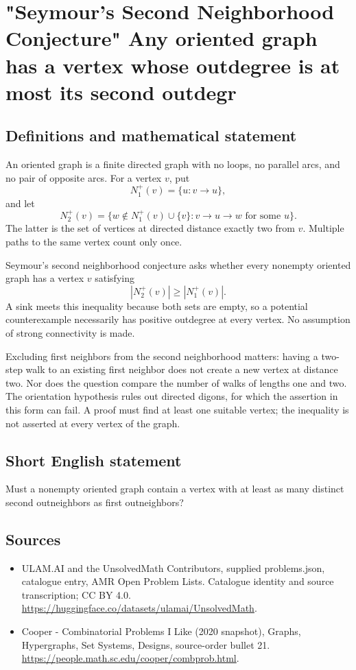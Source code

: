 \documentclass[11pt,a4paper]{article}
\begin{document}
\section*{"Seymour's Second Neighborhood Conjecture" Any oriented graph has a vertex whose outdegree is at most its second outdegr}\label{statement}

\subsection{Definitions and mathematical statement}
An oriented graph is a finite directed graph with no loops, no
parallel arcs, and no pair of opposite arcs. For a vertex $v$, put
\[
 N_1^+(v)=\{u:v\to u\},
\]
and let
\[
 N_2^+(v)=\{w\notin N_1^+(v)\cup\{v\}:
                     v\to u\to w\text{ for some }u\}.
\]
The latter is the set of vertices at directed distance exactly
two from $v$. Multiple paths to the same vertex count only once.

Seymour's second neighborhood conjecture asks whether every
nonempty oriented graph has a vertex $v$ satisfying
\[
                         |N_2^+(v)|\ge |N_1^+(v)|.
\]
A sink meets this inequality because both sets are empty, so a
potential counterexample necessarily has positive outdegree at
every vertex. No assumption of strong connectivity is made.

Excluding first neighbors from the second neighborhood matters:
having a two-step walk to an existing first neighbor does not
create a new vertex at distance two. Nor does the question compare
the number of walks of lengths one and two. The orientation
hypothesis rules out directed digons, for which the assertion in
this form can fail. A proof must find at least one suitable vertex;
the inequality is not asserted at every vertex of the graph.
\subsection{Short English statement}
Must a nonempty oriented graph contain a vertex with at least as many distinct second outneighbors as first outneighbors?
\subsection{Sources}
\begin{itemize}
\item[S1] ULAM.AI and the UnsolvedMath Contributors, supplied problems.json, catalogue entry, AMR Open Problem Lists. Catalogue identity and source transcription; CC BY 4.0.
\url{https://huggingface.co/datasets/ulamai/UnsolvedMath}.
\item[S2] Cooper - Combinatorial Problems I Like (2020 snapshot), Graphs, Hypergraphs, Set Systems, Designs, source-order bullet 21. 
\url{https://people.math.sc.edu/cooper/combprob.html}.
\end{itemize}
\end{document}
